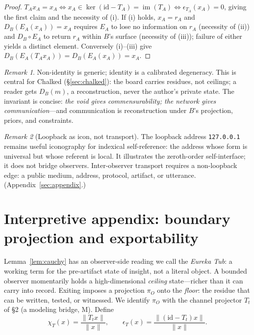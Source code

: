 \documentclass[11pt]{article}
\theoremstyle{definition}
\theoremstyle{remark}
\newtheorem*{remark}{Remark}
\begin{document}
\begin{proof}
$T_Ax_A=x_A\iff x_A\in\ker(\mathrm{id}-T_A)=\operatorname{im}(T_A)\iff\epsilon_{T_A}(x_A)=0$, giving
the first claim and the necessity of (i). If (i) holds, $x_A=r_A$ and
$D_B(E_A(x_A))=x_A$ requires $E_A$ to lose no information on $r_A$ (necessity of (ii)) and
$D_B\circ E_A$ to return $r_A$ within $B$'s surface (necessity of (iii)); failure of either yields a
distinct element. Conversely (i)--(iii) give $D_B(E_A(T_Ax_A))=D_B(E_A(x_A))=x_A$.
\end{proof}

\begin{remark}
Non-identity is generic; identity is a calibrated degeneracy. This is central for Chalked
(\S\ref{sec:chalked}): the board carries residues, not ceilings; a reader gets $D_B(m)$, a
reconstruction, never the author's private state. The invariant is concise: \emph{the void gives
commensurability; the network gives communication}---and communication is reconstruction under $B$'s
projection, priors, and constraints.
\end{remark}

\begin{remark}[Loopback as icon, not transport]
The loopback address \texttt{127.0.0.1} remains useful iconography for indexical self-reference: the
address whose form is universal but whose referent is local. It illustrates the zeroth-order
self-interface; it does not bridge observers. Inter-observer transport requires a non-loopback edge:
a public medium, address, protocol, artifact, or utterance. (Appendix~\ref{sec:appendix}.)
\end{remark}

\section{Interpretive appendix: boundary projection and exportability}\label{sec:eureka}

Lemma~\ref{lem:cauchy} has an observer-side reading we call the \emph{Eureka Tub}: a working term for
the pre-artifact state of insight, not a literal object. A bounded observer momentarily holds a
high-dimensional \emph{ceiling} state---richer than it can carry into record. Exiting imposes a
projection $\pi_O$ onto the \emph{floor}: the residue that can be written, tested, or witnessed. We
identify $\pi_O$ with the channel projector $T_t$ of \S2 (a modeling bridge, M). Define
\[
  \chi_T(x)=\frac{\|T_t x\|}{\|x\|},\qquad
  \epsilon_T(x)=\frac{\|(\mathrm{id}-T_t)x\|}{\|x\|}.
\]
\end{document}
